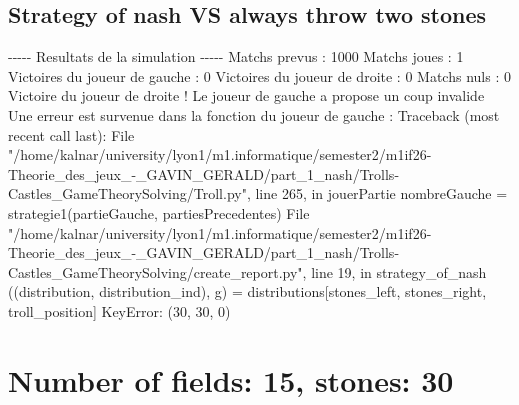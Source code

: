 \documentclass{article}%
\begin{document}
\subsection{Strategy of nash VS always throw two stones}%
\label{subsec:Strategy of nash VS always throw two stones}%
{-}{-}{-}{-}{-} Resultats de la simulation {-}{-}{-}{-}{-}\newline%
		\newline%
Matchs prevus : 1000\newline%
Matchs joues : 1\newline%
\newline%
Victoires du joueur de gauche : 0\newline%
Victoires du joueur de droite : 0\newline%
Matchs nuls : 0\newline%
\newline%
Victoire du joueur de droite ! Le joueur de gauche a propose un coup invalide\newline%
Une erreur est survenue dans la fonction du joueur de gauche : \newline%
Traceback (most recent call last):\newline%
  File "/home/kalnar/university/lyon1/m1.informatique/semester2/m1if26{-}Theorie\_des\_jeux\_{-}\_GAVIN\_GERALD/part\_1\_nash/Trolls{-}Castles\_GameTheorySolving/Troll.py", line 265, in jouerPartie\newline%
    nombreGauche = strategie1(partieGauche, partiesPrecedentes)\newline%
  File "/home/kalnar/university/lyon1/m1.informatique/semester2/m1if26{-}Theorie\_des\_jeux\_{-}\_GAVIN\_GERALD/part\_1\_nash/Trolls{-}Castles\_GameTheorySolving/create\_report.py", line 19, in strategy\_of\_nash\newline%
    ((distribution, distribution\_ind), g) = distributions{[}stones\_left, stones\_right, troll\_position{]}\newline%
KeyError: (30, 30, 0)\newline%

%
\section{Number of fields: 15, stones: 30}%
\label{sec:Number of fields 15, stones 30}%
\end{document}
